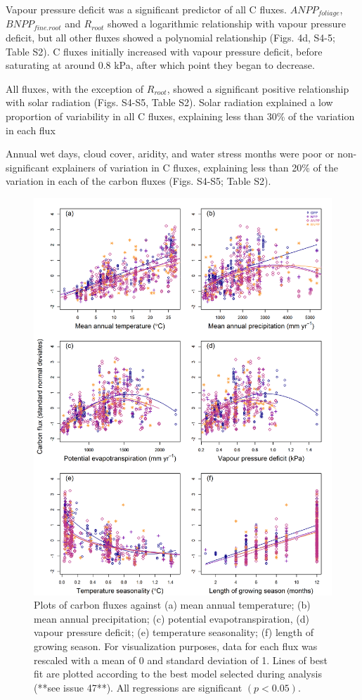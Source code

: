 \documentclass[
]{article}
\begin{document}
Vapour pressure deficit was a significant predictor of all C fluxes.
\(ANPP_{foliage}\), \(BNPP_{fine.root}\) and \(R_{root}\) showed a
logarithmic relationship with vapour pressure deficit, but all other
fluxes showed a polynomial relationship (Figs. 4d, S4-5; Table S2). C
fluxes initially increased with vapour pressure deficit, before
saturating at around 0.8 kPa, after which point they began to decrease.

All fluxes, with the exception of \(R_{root}\), showed a significant
positive relationship with solar radiation (Figs. S4-S5, Table S2).
Solar radiation explained a low proportion of variability in all C
fluxes, explaining less than 30\% of the variation in each flux

Annual wet days, cloud cover, aridity, and water stress months were poor
or non-significant explainers of variation in C fluxes, explaining less
than 20\% of the variation in each of the carbon fluxes (Figs. S4-S5;
Table S2).

\begin{figure}[H]
\includegraphics[width=1\linewidth]{combined_plots} \caption{Plots of carbon fluxes against (a) mean annual temperature; (b) mean annual precipitation; (c) potential evapotranspiration, (d) vapour pressure deficit; (e) temperature seasonality; (f) length of growing season. For visualization purposes, data for each flux was rescaled with a mean of 0 and standard deviation of 1. Lines of best fit are plotted according to the best model selected during analysis (**see issue 47**). All regressions are significant $(p<0.05)$.}\label{fig:unnamed-chunk-9}
\end{figure}
\end{document}

